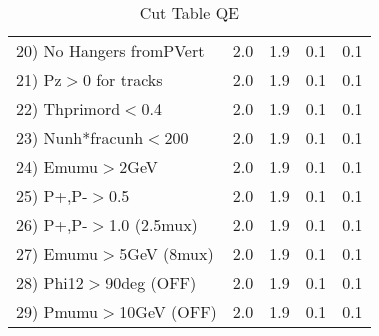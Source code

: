 \begin{table}[h!]
\begin{tabular}{||l||r|r|r|r||}
 20) No Hangers fromPVert &         2.0 &         1.9 &         0.1 &         0.1 \\
 21) Pz$>$0 for tracks    &         2.0 &         1.9 &         0.1 &         0.1 \\
 22) Thprimord$<$0.4      &         2.0 &         1.9 &         0.1 &         0.1 \\
 23) Nunh*fracunh$<$200   &         2.0 &         1.9 &         0.1 &         0.1 \\
 24) Emumu$>$2GeV         &         2.0 &         1.9 &         0.1 &         0.1 \\
 25) P+,P-$>$0.5          &         2.0 &         1.9 &         0.1 &         0.1 \\
 26) P+,P-$>$1.0 (2.5mux) &         2.0 &         1.9 &         0.1 &         0.1 \\
 27) Emumu$>$5GeV  (8mux) &         2.0 &         1.9 &         0.1 &         0.1 \\
 28) Phi12$>$90deg  (OFF) &         2.0 &         1.9 &         0.1 &         0.1 \\
 29) Pmumu$>$10GeV  (OFF) &         2.0 &         1.9 &         0.1 &         0.1 \\
 \hline
 \hline
 \end{tabular}
 \caption{Cut Table  QE     }
 \label{tab-cut____qe}
 \end{table}
